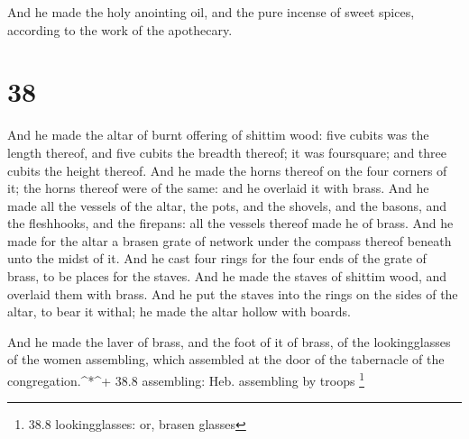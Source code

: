  And he made the holy anointing oil, and the pure incense
of sweet spices, according to the work of the apothecary.

\hypertarget{section-37}{%
\section{38}\label{section-37}}

 And he made the altar of burnt offering of shittim wood:
five cubits was the length thereof, and five cubits the breadth thereof;
it was foursquare; and three cubits the height thereof.  And
he made the horns thereof on the four corners of it; the horns thereof
were of the same: and he overlaid it with brass.  And he
made all the vessels of the altar, the pots, and the shovels, and the
basons, and the fleshhooks, and the firepans: all the vessels thereof
made he of brass.  And he made for the altar a brasen grate
of network under the compass thereof beneath unto the midst of it.
 And he cast four rings for the four ends of the grate of
brass, to be places for the staves.  And he made the staves
of shittim wood, and overlaid them with brass.  And he put
the staves into the rings on the sides of the altar, to bear it withal;
he made the altar hollow with boards.

 And he made the laver of brass, and the foot of it of
brass, of the lookingglasses of the women assembling, which assembled at
the door of the tabernacle of the congregation.\^{}*\^{}+ 38.8
assembling: Heb. assembling by troops \footnote{38.8 lookingglasses: or,
  brasen glasses}


